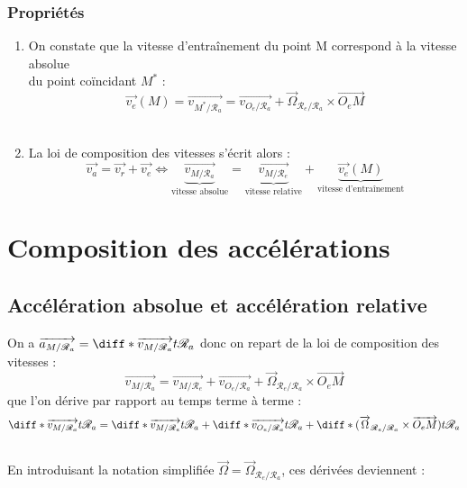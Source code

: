\documentclass[a4paper,10pt]{book} %
\begin{document}
\subsubsection{Propriétés}
\begin{enumerate}
\item On constate que la vitesse d'entraînement du point M correspond à la vitesse absolue\\
du point coïncidant $M^*$ : $$\overrightarrow{v_e}(M)=
\overrightarrow{v_{M^*/\mathcal{R}_a}} =\overrightarrow{v_{O_e/\mathcal{R}_a}} +\overrightarrow{\Omega}_{\mathcal{R}_e/\mathcal{R}_a} \times \overrightarrow{O_eM}$$\\

\item La loi de composition des vitesses s'écrit alors :\\
$$\overrightarrow{v_a}=\overrightarrow{v_r}+\overrightarrow{v_e} \Leftrightarrow \underbrace{\overrightarrow{v_{M/\mathcal{R}_a}}}_{\text{vitesse absolue}}=\underbrace{\overrightarrow{v_{M/\mathcal{R}_e}}}_{\text{vitesse relative}}+\underbrace{\overrightarrow{v_e}(M)}_{\text{vitesse d'entraînement}}$$
\end{enumerate}

\newpage

\section{Composition des accélérations}
\subsection{Accélération absolue et accélération relative}
On a $\overrightarrow{a_{M/\mathcal{R}_a}}=\diff*{\overrightarrow{v_{M/\mathcal{R}_a}}}{t}{\mathcal{R}_a}$ donc on repart de la loi de composition des vitesses :
$$\overrightarrow{v_{M/\mathcal{R}_a}}= \overrightarrow{v_{M/\mathcal{R}_e}}+ \overrightarrow{v_{O_e/\mathcal{R}_a}}+\overrightarrow{\Omega}_{\mathcal{R}_e/\mathcal{R}_a}\times \overrightarrow{O_eM}$$
que l'on dérive par rapport au temps terme à terme :
$$\diff*{\overrightarrow{v_{M/\mathcal{R}_a}}}{t}{\mathcal{R}_a}=\diff*{\overrightarrow{v_{M/\mathcal{R}_e}}}{t}{\mathcal{R}_a}+ \diff*{\overrightarrow{v_{O_e/\mathcal{R}_a}}}{t}{\mathcal{R}_a}+ \diff*{(\overrightarrow{\Omega}_{\mathcal{R}_e/\mathcal{R}_a}\times \overrightarrow{O_eM})}{t}{\mathcal{R}_a}$$\\

En introduisant la notation simplifiée $\overrightarrow{\Omega} =\overrightarrow{\Omega}_{\mathcal{R}_e/\mathcal{R}_a}$, ces dérivées deviennent :
\end{document}
